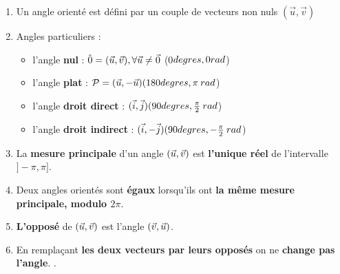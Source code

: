 \begin{multicols}{2}

\begin{enumerate}
\item Un angle orienté est défini par un couple de vecteurs non nuls $(\vec{u}, \vec{v})$

\item Angles particuliers :
\begin{itemize}
	\item l'angle \textbf{nul} : $\hat{0} = (\vec{u}, \vec{v}) , \forall \vec{u} \neq \vec{0} $  (0$\\degres, 0 rad$)
	\item l'angle \textbf{plat} :  $\mathcal{P} = (\vec{u}, -\vec{u}) (180\\degres, \pi \:rad $)
	\item l'angle \textbf{droit direct} : $(\vec{i}, \vec{j}) (90\\degres, \frac{\pi}{2} \: rad$)
	\item l'angle \textbf{droit indirect} : $(\vec{i}, -\vec{j}) (90\\degres, -\frac{\pi}{2} \: rad$)
\end{itemize}

\item La \textbf{mesure principale} d'un angle $(\vec{u}, \vec{v})$ est \textbf{l'unique réel} de l'intervalle $]-\pi, \pi]$.

\item Deux angles orientés sont \textbf{égaux} lorsqu'ils ont \textbf{la même mesure principale, modulo $2\pi$}.

\item \textbf{L'opposé} de $(\vec{u}, \vec{v})$ est l'angle $(\vec{v}, \vec{u})$. %

\item En remplaçant \textbf{les deux vecteurs par leurs opposés} on ne \textbf{change pas l'angle}. %
.
\end{enumerate}
\end{multicols}
